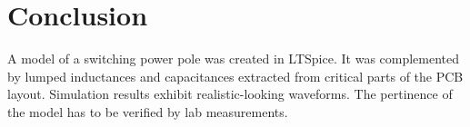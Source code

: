 \section{Conclusion}
\label{sec:conclusion}

A model of a switching power pole was created in LTSpice. It was complemented by lumped inductances and capacitances extracted from critical parts of the PCB layout. Simulation results exhibit realistic-looking waveforms. The pertinence of the model has to be verified by lab measurements.